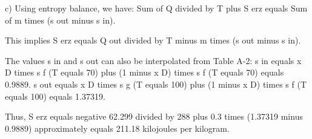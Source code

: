 c) Using entropy balance, we have:  
Sum of Q divided by T plus S erz equals Sum of m times (s out minus s in).  

This implies S erz equals Q out divided by T minus m times (s out minus s in).  

The values s in and s out can also be interpolated from Table A-2:  
s in equals x D times s f (T equals 70) plus (1 minus x D) times s f (T equals 70) equals 0.9889.  
s out equals x D times s g (T equals 100) plus (1 minus x D) times s f (T equals 100) equals 1.37319.  

Thus, S erz equals negative 62.299 divided by 288 plus 0.3 times (1.37319 minus 0.9889) approximately equals 211.18 kilojoules per kilogram.